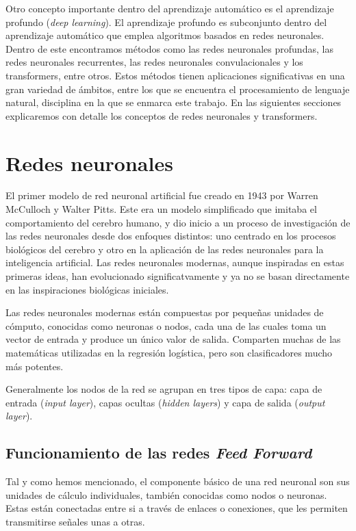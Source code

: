 \documentclass[11pt,spanish,listoffigures,listoftables]{tfgetsinf}
\begin{document}
Otro concepto importante dentro del aprendizaje automático es el aprendizaje profundo (\textit{deep learning}). El aprendizaje profundo es subconjunto dentro del aprendizaje automático que emplea algoritmos basados en redes neuronales. Dentro de este encontramos métodos como las redes neuronales profundas, las redes neuronales recurrentes, las redes neuronales convulacionales y los transformers, entre otros. Estos métodos tienen aplicaciones significativas en una gran variedad de ámbitos, entre los que se encuentra el procesamiento de lenguaje natural, disciplina en la que se enmarca este trabajo. En las siguientes secciones explicaremos con detalle los conceptos de redes neuronales y transformers.

\section{Redes neuronales}

El primer modelo de red neuronal artificial fue creado en 1943 por Warren McCulloch y Walter Pitts. Este era un modelo simplificado que imitaba el comportamiento del cerebro humano, y dio inicio a un proceso de investigación de las redes neuronales desde dos enfoques distintos: uno centrado en los procesos biológicos del cerebro y otro en la aplicación de las redes neuronales para la inteligencia artificial. Las redes neuronales modernas, aunque inspiradas en estas primeras ideas, han evolucionado significatvamente y ya no se basan directamente en las inspiraciones biológicas iniciales.

Las redes neuronales modernas están compuestas por pequeñas unidades de cómputo, conocidas como neuronas o nodos, cada una de las cuales toma un vector de entrada y produce un único valor de salida. Comparten muchas de las matemáticas utilizadas en la regresión logística, pero son clasificadores mucho más potentes.

Generalmente los nodos de la red se agrupan en tres tipos de capa: capa de entrada (\textit{input layer}), capas ocultas (\textit{hidden layers}) y capa de salida (\textit{output layer}).


\subsection{Funcionamiento de las redes \textit{Feed Forward}}

Tal y como hemos mencionado, el componente básico de una red neuronal son sus unidades de cálculo individuales, también conocidas como nodos o neuronas. Estas están conectadas entre si a través de enlaces o conexiones, que les permiten transmitirse señales unas a otras.
\end{document}
